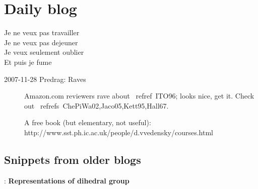 
\chapter{Daily blog}
\label{c-DailyBlog}

\begin{bartlett}{
Je ne veux pas travailler\\
Je ne veux pas dejeuner\\
Je veux seulement oublier\\
Et puis je fume
            }
\end{bartlett}



\begin{description}

\item[2007-11-28 Predrag: Raves]
Amazon.com reviewers rave about ~refref~{ITO96};
looks nice, get it.
Check out
~refrefs~{ChePiWa02,Jaco05,Kett95,Hall67}.

A free book (but elementary, not useful):
\\
http://www.sst.ph.ic.ac.uk/people/d.vvedensky/courses.html

\end{description}

\section{Snippets from older blogs}

: {\bf Representations of dihedral group}

